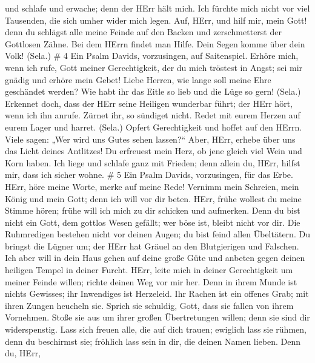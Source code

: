 und schlafe und erwache; denn der HErr hält mich.  Ich
fürchte mich nicht vor viel Tausenden, die sich umher wider mich legen.
 Auf, HErr, und hilf mir, mein Gott! denn du schlägst alle
meine Feinde auf den Backen und zerschmetterst der Gottlosen Zähne.
 Bei dem HErrn findet man Hilfe. Dein Segen komme über dein
Volk! (Sela.) \# 4  Ein Psalm Davids, vorzusingen, auf
Saitenspiel.  Erhöre mich, wenn ich rufe, Gott meiner
Gerechtigkeit, der du mich tröstest in Angst; sei mir gnädig und erhöre
mein Gebet!  Liebe Herren, wie lange soll meine Ehre
geschändet werden? Wie habt ihr das Eitle so lieb und die Lüge so gern!
(Sela.)  Erkennet doch, dass der HErr seine Heiligen
wunderbar führt; der HErr hört, wenn ich ihn anrufe.  Zürnet
ihr, so sündiget nicht. Redet mit eurem Herzen auf eurem Lager und
harret. (Sela.)  Opfert Gerechtigkeit und hoffet auf den
HErrn.  Viele sagen: „Wer wird uns Gutes sehen lassen?{}``
Aber, HErr, erhebe über uns das Licht deines Antlitzes!  Du
erfreuest mein Herz, ob jene gleich viel Wein und Korn haben.
 Ich liege und schlafe ganz mit Frieden; denn allein du,
HErr, hilfst mir, dass ich sicher wohne. \# 5  Ein Psalm
Davids, vorzusingen, für das Erbe.  HErr, höre meine Worte,
merke auf meine Rede!  Vernimm mein Schreien, mein König und
mein Gott; denn ich will vor dir beten.  HErr, frühe wollest
du meine Stimme hören; frühe will ich mich zu dir schicken und
aufmerken.  Denn du bist nicht ein Gott, dem gottlos Wesen
gefällt; wer böse ist, bleibt nicht vor dir.  Die
Ruhmredigen bestehen nicht vor deinen Augen; du bist feind allen
Übeltätern.  Du bringst die Lügner um; der HErr hat Gräuel
an den Blutgierigen und Falschen.  Ich aber will in dein
Haus gehen auf deine große Güte und anbeten gegen deinen heiligen Tempel
in deiner Furcht.  HErr, leite mich in deiner Gerechtigkeit
um meiner Feinde willen; richte deinen Weg vor mir her. 
Denn in ihrem Munde ist nichts Gewisses; ihr Inwendiges ist Herzeleid.
Ihr Rachen ist ein offenes Grab; mit ihren Zungen heucheln sie.
 Sprich sie schuldig, Gott, dass sie fallen von ihrem
Vornehmen. Stoße sie aus um ihrer großen Übertretungen willen; denn sie
sind dir widerspenstig.  Lass sich freuen alle, die auf
dich trauen; ewiglich lass sie rühmen, denn du beschirmst sie; fröhlich
lass sein in dir, die deinen Namen lieben.  Denn du, HErr,
